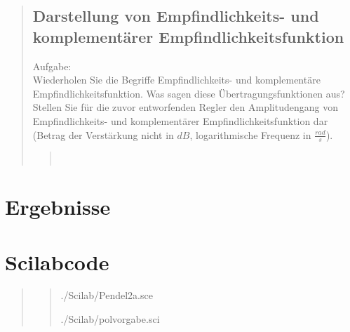 \begin{quote}
    \subsection{Darstellung von Empfindlichkeits- und komplementärer Empfindlichkeitsfunktion}
    Aufgabe:\\
    Wiederholen Sie die Begriffe Empfindlichkeits- und komplementäre Empfindlichkeitsfunktion. Was sagen diese
    Übertragungsfunktionen aus? Stellen Sie für die zuvor entworfenden Regler den Amplitudengang von Empfindlichkeits-
    und komplementärer Empfindlichkeitsfunktion dar (Betrag der Verstärkung nicht in $dB$, logarithmische Frequenz in
    $\frac{rad}{s}$).
    \begin{quote}
         \\
    \end{quote}  %
    
\end{quote} %


\section{Ergebnisse}
\begin{quote}

    
    
\end{quote} %


\section{Scilabcode}
\begin{quote}
\begin{quote}
    
        {./Scilab/Pendel2a.sce}
    
        {./Scilab/polvorgabe.sci}

\end{quote}

	
\end{quote} %

